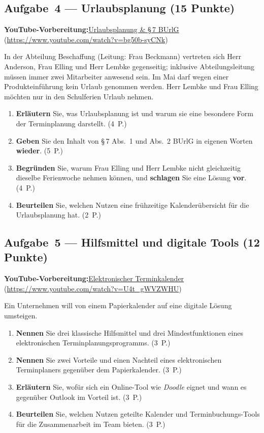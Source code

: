 \documentclass[11pt, a4paper]{article}
\begin{document}
\subsection*{Aufgabe~4 --- Urlaubsplanung (15 Punkte)}

\noindent\textbf{\color{bfwAccent}YouTube-Vorbereitung:}\enspace \href{https://www.youtube.com/watch?v=bg50b-syCNk}{Urlaubsplanung \& §\,7 BUrlG} (\url{https://www.youtube.com/watch?v=bg50b-syCNk})

\medskip
In der Abteilung Beschaffung (Leitung: Frau Beckmann) vertreten sich Herr Anderson,
Frau Elling und Herr Lembke gegenseitig; inklusive Abteilungsleitung müssen immer zwei
Mitarbeiter anwesend sein. Im Mai darf wegen einer Produkteinführung kein Urlaub genommen
werden. Herr Lembke und Frau Elling möchten nur in den Schulferien Urlaub nehmen.

\begin{enumerate}[label=(\alph*)]
  \item \textbf{Erläutern} Sie, was Urlaubsplanung ist und warum sie eine besondere Form der Terminplanung darstellt. \hfill (4~P.)
  \item \textbf{Geben} Sie den Inhalt von §\,7 Abs.~1 und Abs.~2 BUrlG in eigenen Worten \textbf{wieder}. \hfill (5~P.)
  \item \textbf{Begründen} Sie, warum Frau Elling und Herr Lembke nicht gleichzeitig dieselbe Ferienwoche nehmen können, und \textbf{schlagen} Sie eine Lösung \textbf{vor}. \hfill (4~P.)
  \item \textbf{Beurteilen} Sie, welchen Nutzen eine frühzeitige Kalenderübersicht für die Urlaubsplanung hat. \hfill (2~P.)
\end{enumerate}

\subsection*{Aufgabe~5 --- Hilfsmittel und digitale Tools (12 Punkte)}

\noindent\textbf{\color{bfwAccent}YouTube-Vorbereitung:}\enspace \href{https://www.youtube.com/watch?v=U4t_gWVZWHU}{Elektronischer Terminkalender} (\url{https://www.youtube.com/watch?v=U4t_gWVZWHU})

\medskip
Ein Unternehmen will von einem Papierkalender auf eine digitale Lösung umsteigen.

\begin{enumerate}[label=(\alph*)]
  \item \textbf{Nennen} Sie drei klassische Hilfsmittel und drei Mindestfunktionen eines elektronischen Terminplanungsprogramms. \hfill (3~P.)
  \item \textbf{Nennen} Sie zwei Vorteile und einen Nachteil eines elektronischen Terminplaners gegenüber dem Papierkalender. \hfill (3~P.)
  \item \textbf{Erläutern} Sie, wofür sich ein Online-Tool wie \emph{Doodle} eignet und wann es gegenüber Outlook im Vorteil ist. \hfill (3~P.)
  \item \textbf{Beurteilen} Sie, welchen Nutzen geteilte Kalender und Terminbuchungs-Tools für die Zusammenarbeit im Team bieten. \hfill (3~P.)
\end{enumerate}
\end{document}
